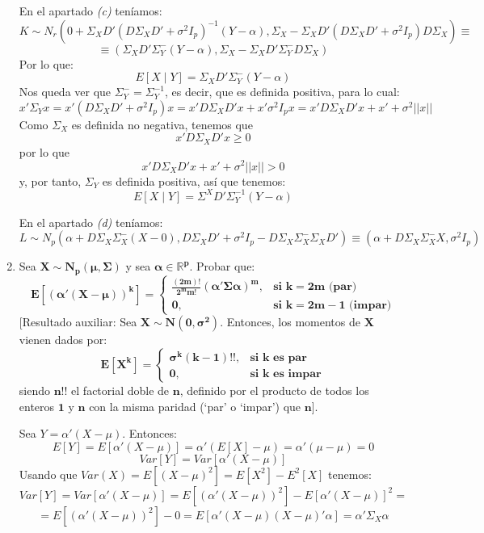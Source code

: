 \documentclass[11pt,a4paper]{article}
\begin{document}
\begin{enumerate}[label=\arabic*.]
En el apartado \emph{(c)} teníamos:
$$K \sim N_{r}(0 + \Sigma_{X}D'(D\Sigma_{X}D' + \sigma^{2}I_{p})^{-1}(Y-\alpha), \Sigma_{X} - \Sigma_{X}D'(D\Sigma_{X}D' + \sigma^{2}I_{p})D\Sigma_{X}) \equiv$$
$$\equiv (\Sigma_{X}D'\Sigma_{Y}^{-}(Y-\alpha), \Sigma_{X} - \Sigma_{X}D'\Sigma_{Y}^{-}D\Sigma_{X})$$
Por lo que:
$$E[X \mid Y] = \Sigma_{X}D'\Sigma_{Y}^{-}(Y-\alpha)$$
Nos queda ver que $\Sigma_{Y}^{-} = \Sigma_{Y}^{-1}$, es decir, que es definida positiva, para lo cual:
$$x'\Sigma_{Y}x = x'(D\Sigma_{X}D' + \sigma^{2}I_{p})x = x'D\Sigma_{X}D'x + x'\sigma^{2}I_{p}x = x'D\Sigma_{X}D'x + x' + \sigma^{2}||x||$$
Como $\Sigma_{X}$ es definida no negativa, tenemos que
$$x'D\Sigma_{X}D'x \geq 0$$
por lo que
$$x'D\Sigma_{X}D'x + x' + \sigma^{2}||x|| > 0$$
y, por tanto, $\Sigma_{Y}$ es definida positiva, así que tenemos:
$$E[X \mid Y] = \Sigma^{X}D'\Sigma_{Y}^{-1}(Y - \alpha)$$

En el apartado \emph{(d)} teníamos:
$$L \sim N_{p} (\alpha + D\Sigma_{X}\Sigma_{X}^{-}(X-0), D\Sigma_{X}D' + \sigma^{2}I_{p} - D\Sigma_{X}\Sigma_{X}^{-}\Sigma_{X}D') \equiv (\alpha + D\Sigma_{X}\Sigma_{X}^{-}X, \sigma^{2}I_{p})$$

\newpage
\bfseries
\item Sea $\mathbf{X \sim N_{p}(\mu, \Sigma)}$ y sea $\mathbf{\alpha \in \mathbb{R}^{p}}$. Probar que:
$$\mathbf{E[(\alpha'(X-\mu))^{k}] = \begin{cases}
\mathbf{\frac{(2m)!}{2^{m}m!}(\alpha'\Sigma\alpha)^{m},} & \mathbf{\text{si } k = 2m \text{ (par)}} \\
\mathbf{0,} & \mathbf{\text{si } k = 2m-1 \text{ (impar)}}
\end{cases}}$$
[Resultado auxiliar: Sea $\mathbf{X \sim N(0, \sigma^{2})}$. Entonces, los momentos de $\mathbf{X}$ vienen dados por:
$$\mathbf{E[X^{k}] = \begin{cases}
\mathbf{\sigma^{k}(k-1)!!,} & \mathbf{\text{si } k \text{ es par}} \\
\mathbf{0,} & \mathbf{\text{si } k \text{ es impar}}
\end{cases}}$$
siendo $\mathbf{n!!}$ el factorial doble de $\mathbf{n}$, definido por el producto de todos los enteros $\mathbf{1}$ y $\mathbf{n}$ con la misma paridad (`par' o `impar') que $\mathbf{n}$].
\vspace{0.5cm}
\normalfont

Sea $Y = \alpha'(X - \mu)$. Entonces:
$$E[Y] = E[\alpha'(X - \mu)] = \alpha'(E[X] - \mu) = \alpha'(\mu - \mu) = 0$$
$$Var[Y] = Var[\alpha'(X - \mu)]$$
Usando que $Var(X) = E[(X - \mu)^{2}] = E[X^{2}] - E^{2}[X]$ tenemos:
$$Var[Y] = Var[\alpha'(X - \mu)] = E[(\alpha'(X - \mu))^{2}] - E[\alpha'(X - \mu)]^{2} =$$
$$= E[(\alpha'(X - \mu))^{2}] - 0 = E[\alpha'(X - \mu)(X - \mu)'\alpha] = \alpha'\Sigma_{X}\alpha$$


\end{enumerate}
\end{document}

